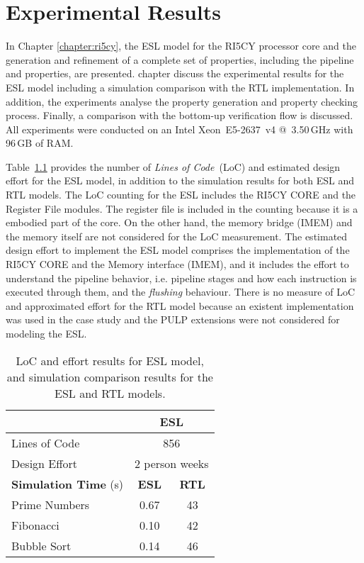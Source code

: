 \chapter{Experimental Results}
\label{chapter:results}


In Chapter \ref{chapter:ri5cy}, the ESL model for the RI5CY processor core and the generation and refinement of a complete set of properties, including the pipeline and \SSQED{} properties, are presented.  chapter  discuss the experimental results for the ESL model including a simulation comparison with the RTL implementation. In addition, the experiments analyse the property generation and property checking process. Finally, a comparison with the bottom-up verification flow is discussed. All experiments were conducted on an Intel Xeon~E5-2637~v4  @~3.50\,GHz with 96\,GB of RAM.


Table~\ref{tab:esl-rtl-comp} provides the number of \textit{Lines of Code}~(LoC) and estimated design effort for the ESL model, in addition to the simulation results for both ESL and RTL models. The LoC counting for the ESL includes the RI5CY CORE and the Register File modules. The register file is included in the counting because it is a embodied part of the core. On the other hand, the memory bridge (IMEM) and the memory itself are not considered for the LoC measurement. The estimated design effort to implement the ESL model comprises the implementation of the RI5CY CORE and the Memory interface (IMEM), and it includes the effort to understand the pipeline behavior, i.e. pipeline stages and how each instruction is executed through them, and the \textit{flushing} behaviour. There is no measure of LoC and approximated effort for the RTL model because an existent implementation was used in the case study and the PULP extensions were not considered for modeling the ESL.  

\begin{table}[htb!] 
	\centering 
	\caption{LoC and effort results for ESL model, and simulation comparison results for the ESL and RTL models.} 
	\label{tab:esl-rtl-comp}
	\begin{tabular}{p{5cm} c c} 
		  &  \multicolumn{2}{c}{\textbf{ESL}} \\     
		\hline	
		Lines of Code  & \multicolumn{2}{c}{856} \\
		Design Effort & \multicolumn{2}{c}{2 person weeks}\\
		\hline
		\textbf{Simulation Time} (s) & \textbf{ESL} & \textbf{RTL}\\
		\hline
		Prime Numbers  &  0.67 & 43 \\
		Fibonacci  &  0.10 & 42 \\
		Bubble Sort  &  0.14 & 46 \\
	\end{tabular} 
\end{table}

